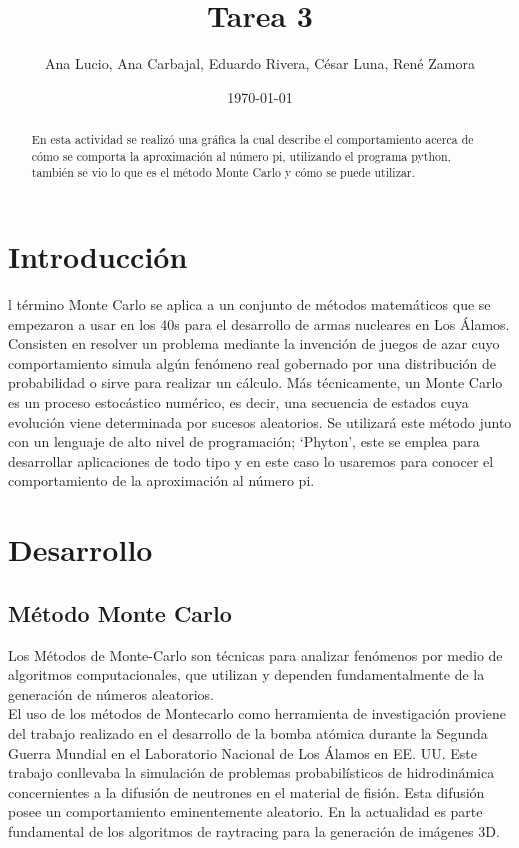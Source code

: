 \documentclass{article}
\author{Ana Lucio,
Ana Carbajal,
Eduardo Rivera,
César Luna,
René Zamora} %
\title{Tarea 3} %
\date{\today}
\begin{document}

\maketitle %
\begin{abstract} %
En esta actividad se realizó una gráfica la cual describe el comportamiento acerca de cómo se comporta la aproximación al número pi, utilizando el programa python, también se vio lo que es el método Monte Carlo y cómo se puede utilizar.
\end{abstract}

\section{Introducción}\label{intro} %
l término Monte Carlo se aplica a un conjunto de métodos matemáticos que se empezaron a usar en los 40s para el desarrollo de armas nucleares en Los Álamos. Consisten en resolver un problema mediante la invención de juegos de azar cuyo comportamiento simula algún fenómeno real gobernado por una distribución de probabilidad o sirve para realizar un cálculo. Más técnicamente, un Monte Carlo es un proceso estocástico numérico, es decir, una secuencia de estados cuya evolución viene determinada por sucesos aleatorios. 
Se utilizará este método junto con un lenguaje de alto nivel de programación; ‘Phyton’, este se emplea para desarrollar aplicaciones de todo tipo y en este caso lo usaremos para conocer el comportamiento de la aproximación al número pi.


\section{Desarrollo}
\subsection{Método Monte Carlo}
Los Métodos de Monte-Carlo son técnicas para analizar fenómenos por medio de algoritmos computacionales, que utilizan y dependen fundamentalmente de la generación de números aleatorios.\\

El uso de los métodos de Montecarlo como herramienta de investigación proviene del trabajo realizado en el desarrollo de la bomba atómica durante la Segunda Guerra Mundial en el Laboratorio Nacional de Los Álamos en EE. UU\cite{1}. Este trabajo conllevaba la simulación de problemas probabilísticos de hidrodinámica concernientes a la difusión de neutrones en el material de fisión. Esta difusión posee un comportamiento eminentemente aleatorio. En la actualidad es parte fundamental de los algoritmos de raytracing para la generación de imágenes 3D.\\
\end{document}
